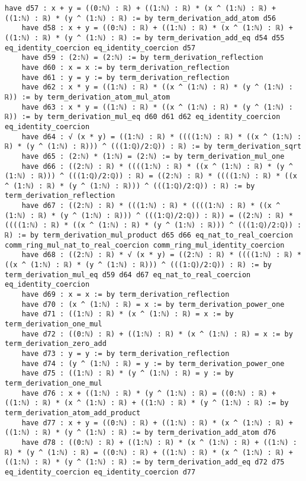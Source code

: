\documentclass{article}
\begin{document}
\begin{tcolorbox}[colback=white!10, width=\linewidth]
\begin{lstlisting}[language=Lean4]
    have d57 : x + y = ((0:ℕ) : ℝ) + ((1:ℕ) : ℝ) * (x ^ (1:ℕ) : ℝ) + ((1:ℕ) : ℝ) * (y ^ (1:ℕ) : ℝ) := by term_derivation_add_atom d56
    have d58 : x + y = ((0:ℕ) : ℝ) + ((1:ℕ) : ℝ) * (x ^ (1:ℕ) : ℝ) + ((1:ℕ) : ℝ) * (y ^ (1:ℕ) : ℝ) := by term_derivation_add_eq d54 d55 eq_identity_coercion eq_identity_coercion d57
    have d59 : (2:ℕ) = (2:ℕ) := by term_derivation_reflection
    have d60 : x = x := by term_derivation_reflection
    have d61 : y = y := by term_derivation_reflection
    have d62 : x * y = ((1:ℕ) : ℝ) * ((x ^ (1:ℕ) : ℝ) * (y ^ (1:ℕ) : ℝ)) := by term_derivation_atom_mul_atom
    have d63 : x * y = ((1:ℕ) : ℝ) * ((x ^ (1:ℕ) : ℝ) * (y ^ (1:ℕ) : ℝ)) := by term_derivation_mul_eq d60 d61 d62 eq_identity_coercion eq_identity_coercion
    have d64 : √ (x * y) = ((1:ℕ) : ℝ) * ((((1:ℕ) : ℝ) * ((x ^ (1:ℕ) : ℝ) * (y ^ (1:ℕ) : ℝ))) ^ (((1:ℚ)/2:ℚ)) : ℝ) := by term_derivation_sqrt
    have d65 : (2:ℕ) * (1:ℕ) = (2:ℕ) := by term_derivation_mul_one
    have d66 : ((2:ℕ) : ℝ) * ((((1:ℕ) : ℝ) * ((x ^ (1:ℕ) : ℝ) * (y ^ (1:ℕ) : ℝ))) ^ (((1:ℚ)/2:ℚ)) : ℝ) = ((2:ℕ) : ℝ) * ((((1:ℕ) : ℝ) * ((x ^ (1:ℕ) : ℝ) * (y ^ (1:ℕ) : ℝ))) ^ (((1:ℚ)/2:ℚ)) : ℝ) := by term_derivation_reflection
    have d67 : ((2:ℕ) : ℝ) * (((1:ℕ) : ℝ) * ((((1:ℕ) : ℝ) * ((x ^ (1:ℕ) : ℝ) * (y ^ (1:ℕ) : ℝ))) ^ (((1:ℚ)/2:ℚ)) : ℝ)) = ((2:ℕ) : ℝ) * ((((1:ℕ) : ℝ) * ((x ^ (1:ℕ) : ℝ) * (y ^ (1:ℕ) : ℝ))) ^ (((1:ℚ)/2:ℚ)) : ℝ) := by term_derivation_mul_product d65 d66 eq_nat_to_real_coercion comm_ring_mul_nat_to_real_coercion comm_ring_mul_identity_coercion
    have d68 : ((2:ℕ) : ℝ) * √ (x * y) = ((2:ℕ) : ℝ) * ((((1:ℕ) : ℝ) * ((x ^ (1:ℕ) : ℝ) * (y ^ (1:ℕ) : ℝ))) ^ (((1:ℚ)/2:ℚ)) : ℝ) := by term_derivation_mul_eq d59 d64 d67 eq_nat_to_real_coercion eq_identity_coercion
    have d69 : x = x := by term_derivation_reflection
    have d70 : (x ^ (1:ℕ) : ℝ) = x := by term_derivation_power_one
    have d71 : ((1:ℕ) : ℝ) * (x ^ (1:ℕ) : ℝ) = x := by term_derivation_one_mul
    have d72 : ((0:ℕ) : ℝ) + ((1:ℕ) : ℝ) * (x ^ (1:ℕ) : ℝ) = x := by term_derivation_zero_add
    have d73 : y = y := by term_derivation_reflection
    have d74 : (y ^ (1:ℕ) : ℝ) = y := by term_derivation_power_one
    have d75 : ((1:ℕ) : ℝ) * (y ^ (1:ℕ) : ℝ) = y := by term_derivation_one_mul
    have d76 : x + ((1:ℕ) : ℝ) * (y ^ (1:ℕ) : ℝ) = ((0:ℕ) : ℝ) + ((1:ℕ) : ℝ) * (x ^ (1:ℕ) : ℝ) + ((1:ℕ) : ℝ) * (y ^ (1:ℕ) : ℝ) := by term_derivation_atom_add_product
    have d77 : x + y = ((0:ℕ) : ℝ) + ((1:ℕ) : ℝ) * (x ^ (1:ℕ) : ℝ) + ((1:ℕ) : ℝ) * (y ^ (1:ℕ) : ℝ) := by term_derivation_add_atom d76
    have d78 : ((0:ℕ) : ℝ) + ((1:ℕ) : ℝ) * (x ^ (1:ℕ) : ℝ) + ((1:ℕ) : ℝ) * (y ^ (1:ℕ) : ℝ) = ((0:ℕ) : ℝ) + ((1:ℕ) : ℝ) * (x ^ (1:ℕ) : ℝ) + ((1:ℕ) : ℝ) * (y ^ (1:ℕ) : ℝ) := by term_derivation_add_eq d72 d75 eq_identity_coercion eq_identity_coercion d77

\end{lstlisting}
\end{tcolorbox}
\end{document}
